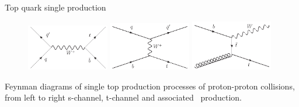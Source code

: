 \begin{frame}{Top quark single production}
\vspace{-.2cm}
\begin{figure}[!Hhtbp]
  \begin{center}
    \includegraphics[width=0.32\textwidth]{../figs/Schannel_top_single.jpg}
    \includegraphics[width=0.32\textwidth]{../figs/Tchannel_top_single.jpg}
    \includegraphics[width=0.32\textwidth]{../figs/TWchannel_top_single.jpg}
  \end{center}
\end{figure}

\vspace{-.2cm}
    \begin{block}{}
      \tiny \centering Feynman diagrams of single top production processes of proton-proton collisions, from left to right s-channel, t-channel and associated \W~production.
    \end{block}

\end{frame}

